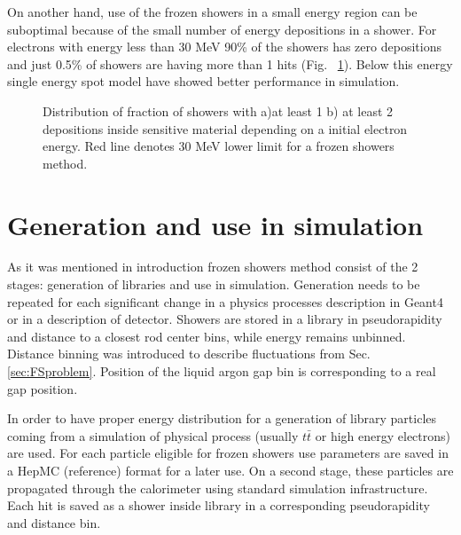 On another hand, use of the frozen showers in a small energy region can be suboptimal because of the small number of energy depositions in a shower. For electrons with energy less than 30 MeV 90\% of the showers has zero depositions and just 0.5\% of showers are having more than 1 hits (Fig. ~\ref{fig:fracHits}). Below this energy single energy spot model have showed better performance in simulation.

\begin{figure}[!tbp]
\begin{minipage}[h]{0.49\linewidth}
\end{minipage}
\hfill
\begin{minipage}[h]{0.49\linewidth}
\end{minipage}
\caption{Distribution of fraction of showers with a)at least 1 b) at least 2 depositions inside sensitive material depending on a initial electron energy. Red line denotes 30 MeV lower limit for a frozen showers method.}
\label{fig:fracHits}
\end{figure}


\section{Generation and use in simulation}

As it was mentioned in introduction frozen showers method consist of the 2 stages: generation of libraries and use in simulation. Generation needs to be repeated for each significant change in a physics processes description in Geant4 or in a description of detector. Showers are stored in a library in pseudorapidity and distance to a closest rod center bins, while energy remains unbinned. Distance binning was introduced to describe fluctuations from Sec. \ref{sec:FSproblem}. Position of the liquid argon gap bin is corresponding to a real gap position. 

In order to have proper energy distribution for a generation of library particles coming from a simulation of physical process (usually $t\bar{t}$ or high energy electrons) are used. For each particle eligible for frozen showers use parameters are saved in a HepMC (reference) format for a later use. On a second stage, these particles are propagated through the calorimeter using standard \atlas simulation infrastructure. Each hit is saved as a shower inside library in a corresponding pseudorapidity and distance bin. 

